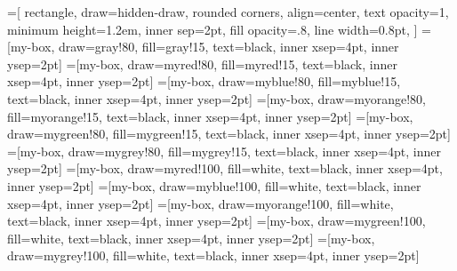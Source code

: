 =[
    rectangle,
    draw=hidden-draw,
    rounded corners,
    align=center,
    text opacity=1,
    minimum height=1.2em,
    inner sep=2pt,
    fill opacity=.8,
    line width=0.8pt,
]
=[my-box, draw=gray!80, fill=gray!15, text=black, inner xsep=4pt, inner ysep=2pt]
=[my-box, draw=myred!80, fill=myred!15, text=black, inner xsep=4pt, inner ysep=2pt]
=[my-box, draw=myblue!80, fill=myblue!15, text=black, inner xsep=4pt, inner ysep=2pt]
=[my-box, draw=myorange!80, fill=myorange!15, text=black, inner xsep=4pt, inner ysep=2pt]
=[my-box, draw=mygreen!80, fill=mygreen!15, text=black, inner xsep=4pt, inner ysep=2pt]
=[my-box, draw=mygrey!80, fill=mygrey!15, text=black, inner xsep=4pt, inner ysep=2pt]
=[my-box, draw=myred!100, fill=white, text=black, inner xsep=4pt, inner ysep=2pt]
=[my-box, draw=myblue!100, fill=white, text=black, inner xsep=4pt, inner ysep=2pt]
=[my-box, draw=myorange!100, fill=white, text=black, inner xsep=4pt, inner ysep=2pt]
=[my-box, draw=mygreen!100, fill=white, text=black, inner xsep=4pt, inner ysep=2pt]
=[my-box, draw=mygrey!100, fill=white, text=black, inner xsep=4pt, inner ysep=2pt]


